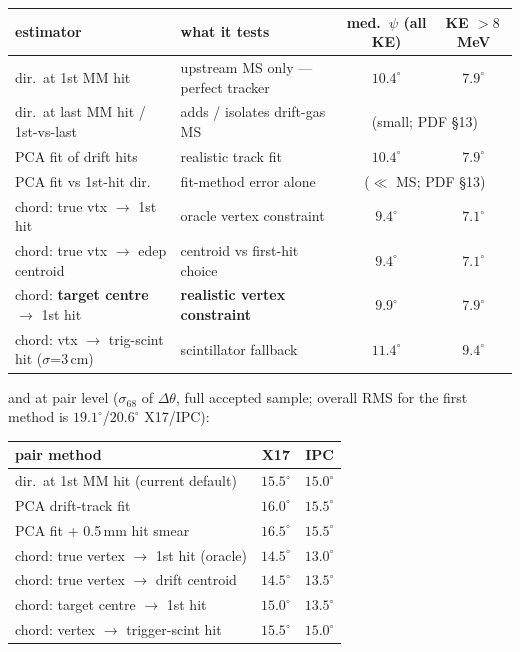\documentclass[11pt,a4paper]{article}
\newcommand{\sig}[1]{\sigma_{68}^{#1}}
\newcommand{\dth}{\Delta\theta}
\begin{document}
\begin{center}
\footnotesize
\begin{tabular}{llcc}
\toprule
estimator & what it tests & med.\ $\psi$ (all KE) & KE $>8$\,MeV \\
\midrule
dir.\ at 1st MM hit & upstream MS only --- perfect tracker & $10.4^{\circ}$ & $7.9^{\circ}$ \\
dir.\ at last MM hit / 1st-vs-last & adds / isolates drift-gas MS & \multicolumn{2}{c}{(small; PDF \S13)} \\
PCA fit of drift hits & realistic track fit & $10.4^{\circ}$ & $7.9^{\circ}$ \\
PCA fit vs 1st-hit dir. & fit-method error alone & \multicolumn{2}{c}{($\ll$ MS; PDF \S13)} \\
chord: true vtx $\to$ 1st hit & oracle vertex constraint & $9.4^{\circ}$ & $7.1^{\circ}$ \\
chord: true vtx $\to$ edep centroid & centroid vs first-hit choice & $9.4^{\circ}$ & $7.1^{\circ}$ \\
chord: \textbf{target centre} $\to$ 1st hit & \textbf{realistic vertex constraint} & $9.9^{\circ}$ & $7.9^{\circ}$ \\
chord: vtx $\to$ trig-scint hit ($\sigma$=3\,cm) & scintillator fallback & $11.4^{\circ}$ & $9.4^{\circ}$ \\
\bottomrule
\end{tabular}
\end{center}

\noindent and at pair level ($\sig{}$ of $\dth$, full accepted sample;
overall RMS for the first method is $19.1^{\circ}$/$20.6^{\circ}$ X17/IPC):

\begin{center}
\small
\begin{tabular}{lcc}
\toprule
pair method & X17 & IPC \\
\midrule
dir.\ at 1st MM hit (current default) & $15.5^{\circ}$ & $15.0^{\circ}$ \\
PCA drift-track fit & $16.0^{\circ}$ & $15.5^{\circ}$ \\
PCA fit + 0.5\,mm hit smear & $16.5^{\circ}$ & $15.5^{\circ}$ \\
chord: true vertex $\to$ 1st hit (oracle) & $14.5^{\circ}$ & $13.0^{\circ}$ \\
chord: true vertex $\to$ drift centroid & $14.5^{\circ}$ & $13.5^{\circ}$ \\
chord: target centre $\to$ 1st hit & $15.0^{\circ}$ & $13.5^{\circ}$ \\
chord: vertex $\to$ trigger-scint hit & $15.5^{\circ}$ & $15.0^{\circ}$ \\
\bottomrule
\end{tabular}
\end{center}
\end{document}
